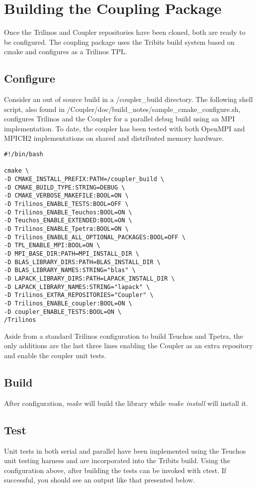 \documentclass[letterpaper]{article}
\begin{document}
\section{Building the Coupling Package}
Once the Trilinos and Coupler repositories have been cloned, both are
ready to be configured. The coupling package uses the Tribits build
system based on cmake and configures as a Trilinos TPL.

\subsection{Configure}
Consider an out of source build in a /coupler\_build directory. The
following shell script, also found in
/Coupler/doc/build\_notes/sample\_cmake\_configure.sh, configures
Trilinos and the Coupler for a parallel debug build using an MPI
implementation. To date, the coupler has been tested with both OpenMPI
and MPICH2 implementations on shared and distributed memory hardware.

\begin{verbatim}
#!/bin/bash

cmake \
-D CMAKE_INSTALL_PREFIX:PATH=/coupler_build \
-D CMAKE_BUILD_TYPE:STRING=DEBUG \
-D CMAKE_VERBOSE_MAKEFILE:BOOL=ON \
-D Trilinos_ENABLE_TESTS:BOOL=OFF \
-D Trilinos_ENABLE_Teuchos:BOOL=ON \
-D Teuchos_ENABLE_EXTENDED:BOOL=ON \
-D Trilinos_ENABLE_Tpetra:BOOL=ON \
-D Trilinos_ENABLE_ALL_OPTIONAL_PACKAGES:BOOL=OFF \
-D TPL_ENABLE_MPI:BOOL=ON \
-D MPI_BASE_DIR:PATH=MPI_INSTALL_DIR \
-D BLAS_LIBRARY_DIRS:PATH=BLAS_INSTALL_DIR \
-D BLAS_LIBRARY_NAMES:STRING="blas" \
-D LAPACK_LIBRARY_DIRS:PATH=LAPACK_INSTALL_DIR \
-D LAPACK_LIBRARY_NAMES:STRING="lapack" \
-D Trilinos_EXTRA_REPOSITORIES="Coupler" \
-D Trilinos_ENABLE_coupler:BOOL=ON \
-D coupler_ENABLE_TESTS:BOOL=ON \
/Trilinos
\end{verbatim}

Aside from a standard Trilinos configuration to build Teuchos and
Tpetra, the only additions are the last three lines enabling the
Coupler as an extra repository and enable the coupler unit tests.

\subsection{Build}

After configuration, {\sl make} will build the library while {\sl make
  install} will install it.

\subsection{Test}
Unit tests in both serial and parallel have been implemented using the
Teuchos unit testing harness and are incorporated into the Tribits
build. Using the configuration above, after building the tests can be
invoked with ctest. If successful, you should see an output like that
presented below.
\end{document}

